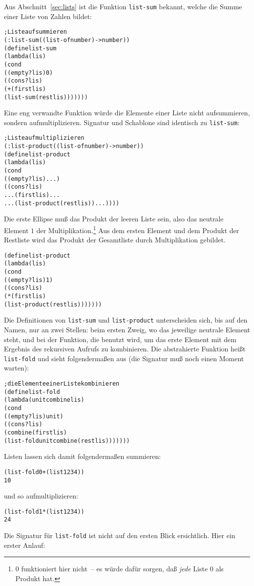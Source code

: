 Aus Abschnitt~\ref{sec:lists} ist die Funktion \texttt{list-sum}
bekannt, welche die Summe einer Liste von Zahlen bildet:
%
\begin{alltt}
; Liste aufsummieren
(: list-sum ((list-of number) -> number))
(define list-sum
  (lambda (lis)
    (cond
      ((empty? lis) 0)
      ((cons? lis) 
       (+ (first lis)
          (list-sum (rest lis)))))))
\end{alltt}
%
Eine eng verwandte Funktion würde die Elemente einer Liste nicht
aufsummieren, sondern aufmultiplizieren.   Signatur und Schablone sind
identisch zu \texttt{list-sum}:
%
\begin{alltt}
; Liste aufmultiplizieren
(: list-product ((list-of number) -> number))
(define list-product
  (lambda (lis)
    (cond
      ((empty? lis) ...)
      ((cons? lis) 
       ... (first lis) ...
       ... (list-product (rest lis)) ...))))
\end{alltt}
%
Die erste Ellipse muß das Produkt der leeren Liste sein, also das
neutrale Element $1$ der Multiplikation.\footnote{0 funktioniert
  hier nicht~-- es würde dafür sorgen,
  daß \emph{jede} Liste 0 als Produkt hat.} 
Aus dem ersten Element und dem Produkt der
Restliste wird das Produkt der Gesamtliste durch
Multiplikation gebildet.
%
\begin{alltt}
(define list-product
  (lambda (lis)
    (cond
      ((empty? lis) 1)
      ((cons? lis) 
       (* (first lis)
          (list-product (rest lis)))))))
\end{alltt}
%
Die Definitionen von \texttt{list-sum} und \texttt{list-product}
unterscheiden sich, bis auf den Namen, nur an zwei Stellen: beim ersten
Zweig, wo das jeweilige neutrale Element steht, und bei der Funktion,
die benutzt wird, um das erste Element mit dem Ergebnis des rekursiven
Aufrufs zu kombinieren.  Die abstrahierte Funktion heißt
\texttt{list-fold} und sieht folgendermaßen aus (die Signatur muß noch
einen Moment warten):
%
\begin{alltt}
; die Elemente einer Liste kombinieren
(define list-fold
  (lambda (unit combine lis)
    (cond
      ((empty? lis) unit)
      ((cons? lis) 
       (combine (first lis)
                (list-fold unit combine (rest lis)))))))
\end{alltt}
%
Listen lassen sich damit folgendermaßen summieren:
%
\begin{alltt}
(list-fold 0 + (list 1 2 3 4))
\evalsto{} 10
\end{alltt}
%
und so aufmultiplizieren:
%
\begin{alltt}
(list-fold 1 * (list 1 2 3 4))
\evalsto{} 24
\end{alltt}
%
Die Signatur für \texttt{list-fold} ist nicht auf den ersten Blick
ersichtlich.  Hier ein erster Anlauf:

